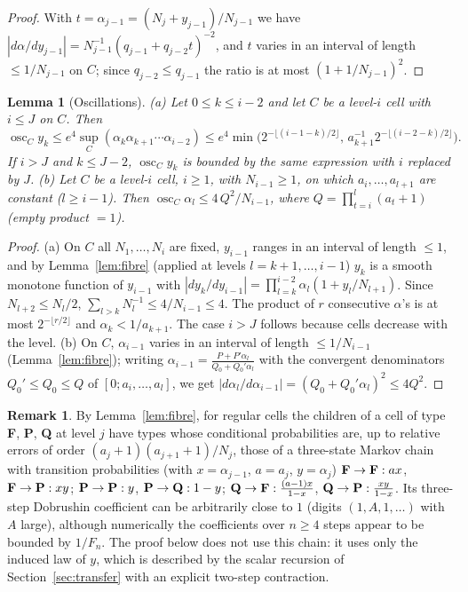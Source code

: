 \documentclass[11pt]{amsart}
\newtheorem{lemma}[theorem]{Lemma}
\theoremstyle{definition}
\newtheorem{remark}[theorem]{Remark}
\numberwithin{equation}{section}
\DeclareMathOperator{\osc}{osc}
\begin{document}
\begin{proof}
With $t=\alpha_{j-1}=(N_j+y_{j-1})/N_{j-1}$ we have $|d\alpha/dy_{j-1}|=N_{j-1}^{-1}(q_{j-1}+q_{j-2}t)^{-2}$, and $t$ varies in an
interval of length $\le1/N_{j-1}$ on $C$; since $q_{j-2}\le q_{j-1}$ the ratio is at most $(1+1/N_{j-1})^2$.
\end{proof}

\begin{lemma}[Oscillations]\label{lem:osc}
\textup{(a)} Let $0\le k\le i-2$ and let $C$ be a level-$i$ cell with $i\le J$ on $C$. Then
\[
\osc_Cy_k\le e^4\sup_C(\alpha_k\alpha_{k+1}\cdots\alpha_{i-2})\le e^4\min\big(2^{-\lfloor (i-1-k)/2\rfloor},\,a_{k+1}^{-1}2^{-\lfloor(i-2-k)/2\rfloor}\big).
\]
If $i>J$ and $k\le J-2$, $\osc_Cy_k$ is bounded by the same expression with $i$ replaced by $J$.
\textup{(b)} Let $C$ be a level-$i$ cell, $i\ge1$, with $N_{i-1}\ge1$, on which $a_i,\dots,a_{l+1}$ are constant ($l\ge i-1$). Then
$\osc_C\alpha_l\le 4\,Q^2/N_{i-1}$, where $Q=\prod_{t=i}^{l}(a_t+1)$ (empty product $=1$).
\end{lemma}

\begin{proof}
(a) On $C$ all $N_1,\dots,N_i$ are fixed, $y_{i-1}$ ranges in an interval of length $\le1$, and by Lemma~\ref{lem:fibre} (applied at
levels $l=k+1,\dots,i-1$) $y_k$ is a smooth monotone function of $y_{i-1}$ with
$|dy_k/dy_{i-1}|=\prod_{l=k}^{i-2}\alpha_l(1+y_l/N_{l+1})$. Since $N_{l+2}\le N_l/2$, $\sum_{l>k}N_l^{-1}\le4/N_{i-1}\le4$.
The product of $r$ consecutive $\alpha$'s is at most $2^{-\lfloor r/2\rfloor}$ and $\alpha_k<1/a_{k+1}$. The case $i>J$ follows
because cells decrease with the level.
(b) On $C$, $\alpha_{i-1}$ varies in an interval of length $\le1/N_{i-1}$ (Lemma~\ref{lem:fibre}); writing
$\alpha_{i-1}=\frac{P+P'\alpha_l}{Q_0+Q_0'\alpha_l}$ with the convergent denominators $Q_0'\le Q_0\le Q$ of
$[0;a_i,\dots,a_l]$, we get $|d\alpha_l/d\alpha_{i-1}|=(Q_0+Q_0'\alpha_l)^2\le4Q^2$.
\end{proof}

\begin{remark}\label{rem:typechain}
By Lemma~\ref{lem:fibre}, for regular cells the children of a cell of type \textbf F, \textbf P, \textbf Q at level $j$ have types whose
conditional probabilities are, up to relative errors of order $(a_j+1)(a_{j+1}+1)/N_j$, those of a three-state Markov chain with
transition probabilities (with $x=\alpha_{j-1}$, $a=a_j$, $y=\alpha_j$)
$\textbf F\to\textbf F: ax$, $\textbf F\to\textbf P: xy$; $\textbf P\to\textbf P: y$, $\textbf P\to\textbf Q:1-y$;
$\textbf Q\to\textbf F:\frac{(a-1)x}{1-x}$, $\textbf Q\to\textbf P:\frac{xy}{1-x}$. Its three-step Dobrushin coefficient can be arbitrarily close
to $1$ (digits $(1,A,1,\dots)$ with $A$ large), although numerically the coefficients over $n\ge4$ steps appear to be bounded by $1/F_n$.
The proof below does not use this chain: it uses only the induced law of $y$, which is described by the scalar recursion of
Section~\ref{sec:transfer} with an explicit two-step contraction.
\end{remark}
\end{document}
